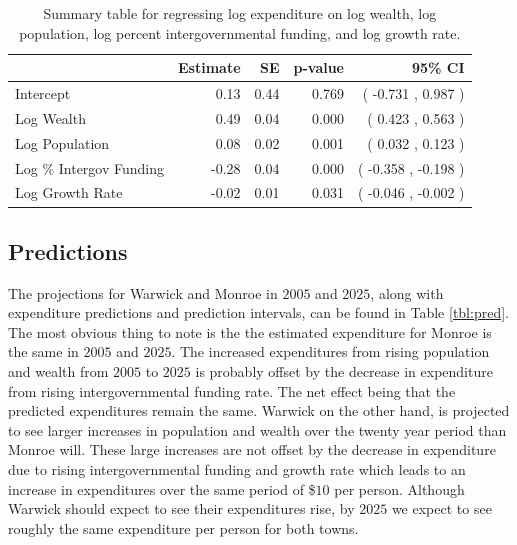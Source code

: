 \documentclass{article}\usepackage[]{graphicx}\usepackage[]{color}
\begin{document}





\begin{table}[ht]
\centering
\begin{tabular}{|l|rrrr|}
  \hline
 & Estimate & SE & p-value & 95\% CI \\ 
  \hline
Intercept & 0.13 & 0.44 & 0.769 & ( -0.731 , 0.987 ) \\ 
  Log Wealth & 0.49 & 0.04 & 0.000 & ( 0.423 , 0.563 ) \\ 
  Log Population & 0.08 & 0.02 & 0.001 & ( 0.032 , 0.123 ) \\ 
  Log \% Intergov Funding & -0.28 & 0.04 & 0.000 & ( -0.358 , -0.198 ) \\ 
  Log Growth Rate & -0.02 & 0.01 & 0.031 & ( -0.046 , -0.002 ) \\ 
   \hline
\end{tabular}
\caption{Summary table for regressing log expenditure on log wealth, log population, log percent intergovernmental funding, and log growth rate.} 
\label{tbl:regress}
\end{table}



\subsection{Predictions}

The projections for Warwick and Monroe in $2005$ and $2025$, along with expenditure predictions and prediction intervals, can be found in Table \ref{tbl:pred}. The most obvious thing to note is the the estimated expenditure for Monroe is the same in $2005$ and $2025$. The increased expenditures from rising population and wealth from $2005$ to $2025$ is probably offset by the decrease in expenditure from rising intergovernmental funding rate. The net effect being that the predicted expenditures remain the same. Warwick on the other hand, is projected to see larger increases in population and wealth over the twenty year period than Monroe will. These large increases are not offset by the decrease in expenditure due to rising intergovernmental funding and growth rate which leads to an increase in expenditures over the same period of \$$10$ per person. Although Warwick should expect to see their expenditures rise, by $2025$ we expect to see roughly the same expenditure per person for both towns.
\end{document}
